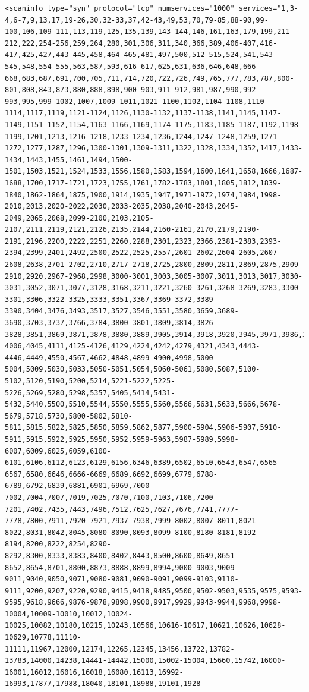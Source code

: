 \documentclass[10pt,a4paper,titlepage]{article}
\begin{document}
\begin{verbatim}
<scaninfo type="syn" protocol="tcp" numservices="1000" services="1,3-4,6-7,9,13,17,19-26,30,32-33,37,42-43,49,53,70,79-85,88-90,99-100,106,109-111,113,119,125,135,139,143-144,146,161,163,179,199,211-212,222,254-256,259,264,280,301,306,311,340,366,389,406-407,416-417,425,427,443-445,458,464-465,481,497,500,512-515,524,541,543-545,548,554-555,563,587,593,616-617,625,631,636,646,648,666-668,683,687,691,700,705,711,714,720,722,726,749,765,777,783,787,800-801,808,843,873,880,888,898,900-903,911-912,981,987,990,992-993,995,999-1002,1007,1009-1011,1021-1100,1102,1104-1108,1110-1114,1117,1119,1121-1124,1126,1130-1132,1137-1138,1141,1145,1147-1149,1151-1152,1154,1163-1166,1169,1174-1175,1183,1185-1187,1192,1198-1199,1201,1213,1216-1218,1233-1234,1236,1244,1247-1248,1259,1271-1272,1277,1287,1296,1300-1301,1309-1311,1322,1328,1334,1352,1417,1433-1434,1443,1455,1461,1494,1500-1501,1503,1521,1524,1533,1556,1580,1583,1594,1600,1641,1658,1666,1687-1688,1700,1717-1721,1723,1755,1761,1782-1783,1801,1805,1812,1839-1840,1862-1864,1875,1900,1914,1935,1947,1971-1972,1974,1984,1998-2010,2013,2020-2022,2030,2033-2035,2038,2040-2043,2045-2049,2065,2068,2099-2100,2103,2105-2107,2111,2119,2121,2126,2135,2144,2160-2161,2170,2179,2190-2191,2196,2200,2222,2251,2260,2288,2301,2323,2366,2381-2383,2393-2394,2399,2401,2492,2500,2522,2525,2557,2601-2602,2604-2605,2607-2608,2638,2701-2702,2710,2717-2718,2725,2800,2809,2811,2869,2875,2909-2910,2920,2967-2968,2998,3000-3001,3003,3005-3007,3011,3013,3017,3030-3031,3052,3071,3077,3128,3168,3211,3221,3260-3261,3268-3269,3283,3300-3301,3306,3322-3325,3333,3351,3367,3369-3372,3389-3390,3404,3476,3493,3517,3527,3546,3551,3580,3659,3689-3690,3703,3737,3766,3784,3800-3801,3809,3814,3826-3828,3851,3869,3871,3878,3880,3889,3905,3914,3918,3920,3945,3971,3986,3995,3998,4000-4006,4045,4111,4125-4126,4129,4224,4242,4279,4321,4343,4443-4446,4449,4550,4567,4662,4848,4899-4900,4998,5000-5004,5009,5030,5033,5050-5051,5054,5060-5061,5080,5087,5100-5102,5120,5190,5200,5214,5221-5222,5225-5226,5269,5280,5298,5357,5405,5414,5431-5432,5440,5500,5510,5544,5550,5555,5560,5566,5631,5633,5666,5678-5679,5718,5730,5800-5802,5810-5811,5815,5822,5825,5850,5859,5862,5877,5900-5904,5906-5907,5910-5911,5915,5922,5925,5950,5952,5959-5963,5987-5989,5998-6007,6009,6025,6059,6100-6101,6106,6112,6123,6129,6156,6346,6389,6502,6510,6543,6547,6565-6567,6580,6646,6666-6669,6689,6692,6699,6779,6788-6789,6792,6839,6881,6901,6969,7000-7002,7004,7007,7019,7025,7070,7100,7103,7106,7200-7201,7402,7435,7443,7496,7512,7625,7627,7676,7741,7777-7778,7800,7911,7920-7921,7937-7938,7999-8002,8007-8011,8021-8022,8031,8042,8045,8080-8090,8093,8099-8100,8180-8181,8192-8194,8200,8222,8254,8290-8292,8300,8333,8383,8400,8402,8443,8500,8600,8649,8651-8652,8654,8701,8800,8873,8888,8899,8994,9000-9003,9009-9011,9040,9050,9071,9080-9081,9090-9091,9099-9103,9110-9111,9200,9207,9220,9290,9415,9418,9485,9500,9502-9503,9535,9575,9593-9595,9618,9666,9876-9878,9898,9900,9917,9929,9943-9944,9968,9998-10004,10009-10010,10012,10024-10025,10082,10180,10215,10243,10566,10616-10617,10621,10626,10628-10629,10778,11110-11111,11967,12000,12174,12265,12345,13456,13722,13782-13783,14000,14238,14441-14442,15000,15002-15004,15660,15742,16000-16001,16012,16016,16018,16080,16113,16992-16993,17877,17988,18040,18101,18988,19101,1928
\end{verbatim}
\end{document}

